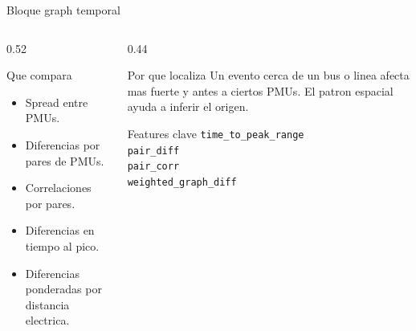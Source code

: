 \documentclass[10pt,aspectratio=169]{beamer}
\newcommand{\code}[1]{\texttt{\footnotesize #1}}
\begin{document}
\begin{frame}{Bloque graph temporal}
\small
\begin{columns}[T,totalwidth=\textwidth]
\begin{column}{0.52\textwidth}
\begin{block}{Que compara}
\begin{itemize}
  \item Spread entre PMUs.
  \item Diferencias por pares de PMUs.
  \item Correlaciones por pares.
  \item Diferencias en tiempo al pico.
  \item Diferencias ponderadas por distancia electrica.
\end{itemize}
\end{block}
\end{column}
\begin{column}{0.44\textwidth}
\begin{exampleblock}{Por que localiza}
Un evento cerca de un bus o linea afecta mas fuerte y antes a ciertos PMUs. El patron espacial ayuda a inferir el origen.
\end{exampleblock}
\begin{alertblock}{Features clave}
\code{time\_to\_peak\_range}\\
\code{pair\_diff}\\
\code{pair\_corr}\\
\code{weighted\_graph\_diff}
\end{alertblock}
\end{column}
\end{columns}
\end{frame}
\end{document}
